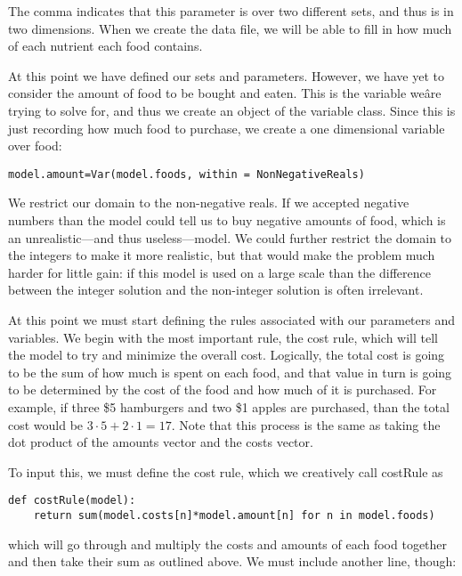 \documentclass{article}
\begin{document}
The comma indicates that this parameter is over two different sets, and thus is in two dimensions.  When we create the data file, we will be able to fill in how much of each nutrient each food contains.

At this point we have defined our sets and parameters.  However, we have yet to consider the amount of food to be bought and eaten.  This is the variable weâre trying to solve for, and thus we create an object of the variable class.  Since this is just recording how much food to purchase, we create a one dimensional variable over food:

\begin{verbatim}model.amount=Var(model.foods, within = NonNegativeReals) \end{verbatim}

We restrict our domain to the non-negative reals.  If we accepted negative numbers than the model could tell us to buy negative amounts of food, which is an unrealistic---and thus useless---model.  We could further restrict the domain to the integers to make it more realistic, but that would make the problem much harder for little gain: if this model is used on a large scale than the difference between the integer solution and the non-integer solution is often irrelevant.

At this point we must start defining the rules associated with our parameters and variables.  We begin with the most important rule, the cost rule, which will tell the model to try and minimize the overall cost.  Logically, the total cost is going to be the sum of how much is spent on each food, and that value in turn is going to be determined by the cost of the food and how much of it is purchased.  For example, if three \$5 hamburgers and two \$1 apples are purchased, than the total cost would be $3 \cdot 5 + 2 \cdot 1 = 17$.  Note that this process is the same as taking the dot product of the amounts vector and the costs vector.

To input this, we must define the cost rule, which we creatively call costRule as

\begin{verbatim}def costRule(model):
    return sum(model.costs[n]*model.amount[n] for n in model.foods)
\end{verbatim}

\noindent
which will go through and multiply the costs and amounts of each food together and then take their sum as outlined above.  We must include another line, though:
\end{document}
